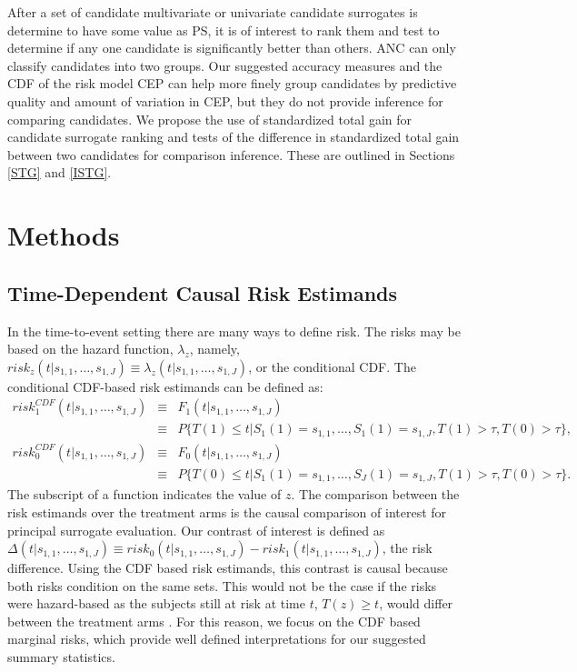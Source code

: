 \documentclass[times, doublespace]{simauth}
\begin{document}
After a set of candidate multivariate or univariate candidate surrogates is determine to have some value as PS, it is of interest to rank them and test to determine if any one candidate is significantly better than others. ANC can only classify candidates into two groups. Our suggested accuracy measures and the CDF of the risk model CEP can help more finely group candidates by predictive quality and amount of variation in CEP, but they do not provide inference for comparing candidates. We propose the use of standardized total gain for candidate surrogate ranking and tests of the difference in standardized total gain between two candidates for comparison inference. These are outlined in Sections \ref{STG} and \ref{ISTG}. 

\section{Methods}
\subsection{Time-Dependent Causal Risk Estimands} \label{CRE}
In the time-to-event setting there are many ways to define risk. The risks may be based on the hazard function, $\lambda_z$, namely, $risk_{z}(t|s_{1,1},\ldots,s_{1,J})\equiv\lambda_z(t|s_{1,1},\ldots,s_{1,J})$, or the conditional CDF. The conditional CDF-based risk estimands can be defined as:
\begin{eqnarray*}
risk_{1}^{CDF}(t|s_{1,1}, \ldots, s_{1,J}) &\equiv& F_1(t|s_{1,1}, \ldots, s_{1,J})\\
&\equiv& P\{T(1) \leq t|S_{1}(1)=s_{1,1},\ldots, S_{1}(1)=s_{1,J},T(1)> \tau, T(0)> \tau\},\\
risk_{0}^{CDF}(t|s_{1,1}, \ldots, s_{1,J}) &\equiv& F_0(t|s_{1,1}, \ldots, s_{1,J}) \\
&\equiv& P\{T(0) \leq t|S_{1}(1)=s_{1,1},\ldots, S_{J}(1)=s_{1,J},T(1)>\tau, T(0)>\tau\}.
\end{eqnarray*}
The subscript of a function indicates the value of $z$. The comparison between the risk estimands over the treatment arms is the causal comparison of interest for principal surrogate evaluation. Our contrast of interest is defined as $\Delta(t|s_{1,1}, \dots, s_{1,J}) \equiv risk_0(t|s_{1,1}, \ldots, s_{1,J})-risk_1(t|s_{1,1}, \ldots, s_{1,J})$, the risk difference. Using the CDF based risk estimands, this contrast is causal because both risks condition on the same sets. This would not be the case if the risks were hazard-based as the subjects still at risk at time $t$, $T(z)\geq t$, would differ between the treatment arms \citep{Hernan10, Gabriel13}. For this reason, we focus on the CDF based marginal risks, which provide well defined  interpretations for our suggested summary statistics.
\end{document}
